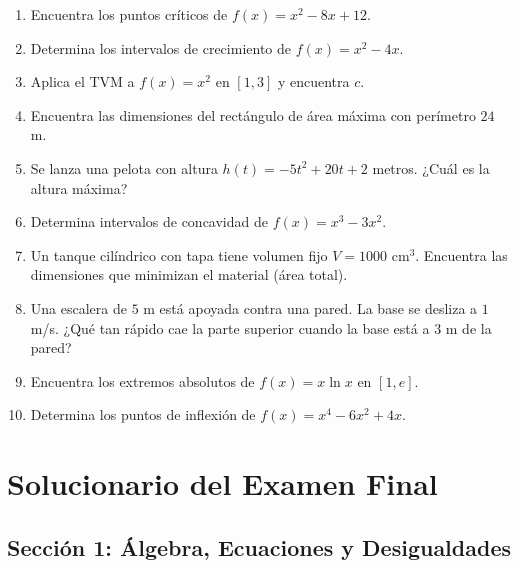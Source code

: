 \documentclass[12pt, letterpaper]{article}
\begin{document}
\begin{enumerate}[resume=ejercicios, leftmargin=*]
  \item \facil{} Encuentra los puntos críticos de $f(x) = x^2 - 8x + 12$.

  \item \facil{} Determina los intervalos de crecimiento de $f(x) = x^2 - 4x$.

  \item \facil{} Aplica el TVM a $f(x) = x^2$ en $[1, 3]$ y encuentra $c$.

  \item \medio{} Encuentra las dimensiones del rectángulo de área máxima con perímetro $24$ m.

  \item \medio{} Se lanza una pelota con altura $h(t) = -5t^2 + 20t + 2$ metros. ¿Cuál es la altura máxima?

  \item \medio{} Determina intervalos de concavidad de $f(x) = x^3 - 3x^2$.

  \item \dificil{} Un tanque cilíndrico con tapa tiene volumen fijo $V = 1000$ cm$^3$. Encuentra las dimensiones que minimizan el material (área total).

  \item \dificil{} Una escalera de $5$ m está apoyada contra una pared. La base se desliza a $1$ m/s. ¿Qué tan rápido cae la parte superior cuando la base está a $3$ m de la pared?

  \item \dificil{} Encuentra los extremos absolutos de $f(x) = x \ln x$ en $[1, e]$.

  \item \dificil{} Determina los puntos de inflexión de $f(x) = x^4 - 6x^2 + 4x$.
\end{enumerate}

\newpage

\section{Solucionario del Examen Final}

\subsection*{Sección 1: Álgebra, Ecuaciones y Desigualdades}
\end{document}
